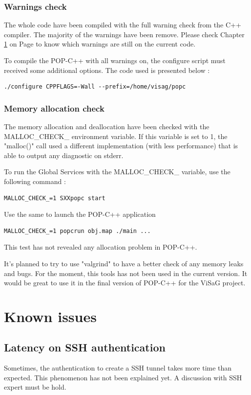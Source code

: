 \subsubsection{Warnings check}
The whole code have been compiled with the full warning check from the C++ compiler. The majority of the warnings have been remove. Please check Chapter \ref{known_issues} on Page \pageref{known_issues} to know which warnings are still on the current code. \s

To compile the POP-C++ with all warnings on, the configure script must received some additional options. The code used is presented below : \s

\begin{lstlisting}
./configure CPPFLAGS=-Wall --prefix=/home/visag/popc
\end{lstlisting}

\subsubsection{Memory allocation check}
The memory allocation and deallocation have been checked with the MALLOC\_CHECK\_ environment variable. If this variable is set to 1, the "malloc()" call used a different implementation (with less performance) that is able to output any diagnostic on stderr.\s

To run the Global Services with the MALLOC\_CHECK\_ variable, use the following command : 
\begin{lstlisting}
MALLOC_CHECK_=1 SXXpopc start
\end{lstlisting}\s

Use the same to launch the POP-C++ application
\begin{lstlisting}
MALLOC_CHECK_=1 popcrun obj.map ./main ...
\end{lstlisting}\s

This test has not revealed any allocation problem in POP-C++. \s

It's planned to try to use "valgrind"\cite{valgrind} to have a better check of any memory leaks and bugs. For the moment, this tools has not been used in the current version. It would be great to use it in the final version of POP-C++ for the ViSaG project. 

\pagebreak
\section{Known issues}
\label{known_issues}
\subsection{Latency on SSH authentication}
Sometimes, the authentication to create a SSH tunnel takes more time than expected. This phenomenon has not been explained yet. A discussion with SSH expert must be hold.

